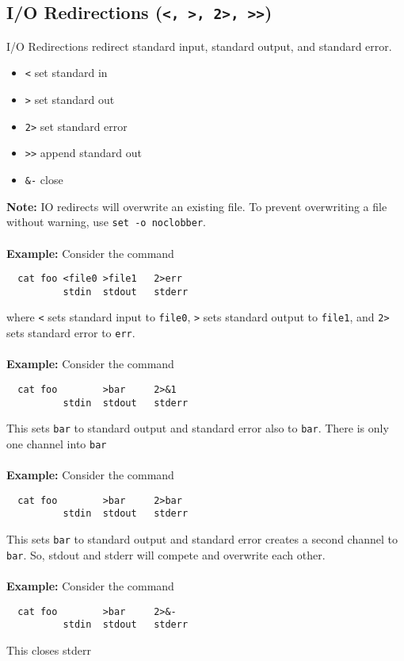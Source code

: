 \documentclass[13pt]{article}
\begin{document}
\subsection{I/O Redirections (\texttt{<, >, 2>, >>})}
I/O Redirections redirect standard input, standard output, and standard error.
\begin{itemize}[leftmargin = 0pt]
\item [] \texttt{<} set standard in
\item [] \texttt{>} set standard out
\item [] \texttt{2>} set standard error
\item [] \texttt{>>} append standard out
\item [] \texttt{\&-} close
\end{itemize}
\textbf{Note:} IO redirects will overwrite an existing file. To prevent overwriting a file without warning, use \texttt{set -o noclobber}. \\ \\
\textbf{Example:} Consider the command
\begin{verbatim}
  cat foo <file0 >file1   2>err
          stdin  stdout   stderr \end{verbatim}
        where \texttt{<} sets standard input to \texttt{file0}, \texttt{>} sets standard output to \texttt{file1}, and \texttt{2>} sets standard error to \texttt{err}. \\ \\
        \textbf{Example:} Consider the command
\begin{verbatim}
  cat foo        >bar     2>&1
          stdin  stdout   stderr \end{verbatim}
        This sets \texttt{bar} to standard output and standard error also to \texttt{bar}. There is only one channel into \texttt{bar} \\ \\
        \textbf{Example:} Consider the command
\begin{verbatim}
  cat foo        >bar     2>bar
          stdin  stdout   stderr \end{verbatim}
        This sets \texttt{bar} to standard output and standard error creates a second channel to \texttt{bar}. So, stdout and stderr will compete and overwrite each other. \\ \\
        \textbf{Example:} Consider the command
\begin{verbatim}
  cat foo        >bar     2>&-
          stdin  stdout   stderr \end{verbatim}
        This closes stderr
\end{document}
